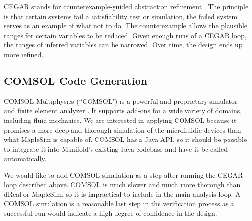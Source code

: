 CEGAR stands for counterexample-guided abstraction refinement \cite{cegar}.
The principle is that certain systems fail a satisfiability test or simulation, the failed system serves as an example of what not to do.
The counterexample allows the plausible ranges for certain variables to be reduced.
Given enough runs of a CEGAR loop, the ranges of inferred variables can be narrowed.
Over time, the design ends up more refined.

\subsection{COMSOL Code Generation}

COMSOL Multiphysics (``COMSOL") \cite{comsol} is a powerful and proprietary simulator and finite element analyzer \cite{fem}.
It supports add-ons for a wide variety of domains, including fluid mechanics.
We are interested in applying COMSOL because it promises a more deep and thorough simulation of the microfluidic devices than what MapleSim is capable of.
COMSOL has a Java API, so it should be possible to integrate it into Manifold's existing Java codebase and have it be called automatically.

We would like to add COMSOL simulation as a step after running the CEGAR loop described above.
COMSOL is much slower and much more thorough than dReal or MapleSim, so it is impractical to include
in the main analysis loop. A COMSOL simulation is a reasonable last step in the
verification process as a successful run would indicate a high degree of confidence in the design.
